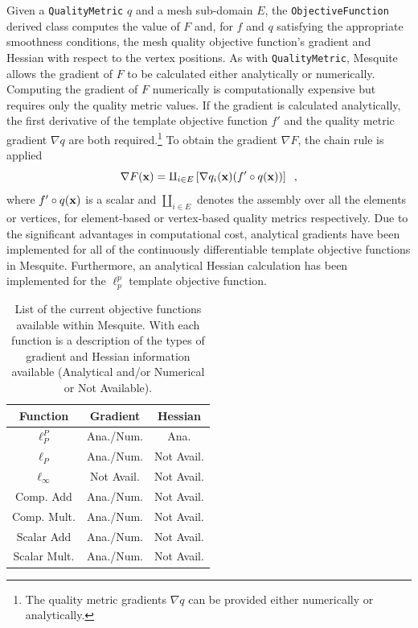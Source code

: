 Given a \texttt{QualityMetric} $q$ and a mesh sub-domain $E$, the
\texttt{ObjectiveFunction} derived class computes the value of 
$F$ and, for $f$ and $q$ satisfying the appropriate smoothness
conditions, the mesh quality objective function's gradient and Hessian
with respect to the vertex positions.  As with {\tt QualityMetric},
Mesquite allows the gradient of $F$ to be calculated either
analytically or numerically. Computing the gradient of $F$
numerically is computationally expensive but requires only the quality
metric values.  If the gradient is calculated analytically, the
first derivative of the template objective function $f'$ and the
quality metric gradient $\nabla q$ are both required.\footnote{The 
quality metric gradients $\nabla q$ can be provided either numerically 
or analytically.}
To obtain the gradient $\nabla F$, the chain rule is applied
\begin{equation}
\nabla F({\bf x}) = \amalg_{i \in E} \left[ \nabla q_i({\bf x}) 
 (f' \circ q({\bf x}) ) \right] \;\; ,
\end{equation}
where $ f' \circ q({\bf x})$ is a scalar and $\amalg_{i \in E}$ denotes the
assembly over all the elements or vertices, for element-based or 
vertex-based quality metrics respectively.
Due to the significant advantages in computational
cost, analytical gradients have been implemented for all of the
continuously differentiable template objective functions in Mesquite.
Furthermore, an analytical Hessian calculation has been implemented
for the $\ell_p^p$ template objective function.  

\begin{table}[htb]
\begin{center}
\begin{tabular}{|c|c|c|}
\hline
Function & Gradient & Hessian\\
\hline
$\ell_P^P$     & Ana./Num.&Ana.\\
$\ell_P$       & Ana./Num.& Not Avail.\\
$\ell_{\infty}$& Not Avail.& Not Avail.\\
Comp. Add      & Ana./Num.& Not Avail.\\
Comp. Mult.    & Ana./Num.& Not Avail.\\
Scalar Add     & Ana./Num.& Not Avail.\\
Scalar Mult.   & Ana./Num.& Not Avail.\\
\hline
\end{tabular}
\label{current-objfunc}
\caption{List of the current objective functions available within
Mesquite.  With each function is a description of the types of
gradient and Hessian information available (Analytical and/or Numerical
or Not Available).}
\end{center}
\end{table}

